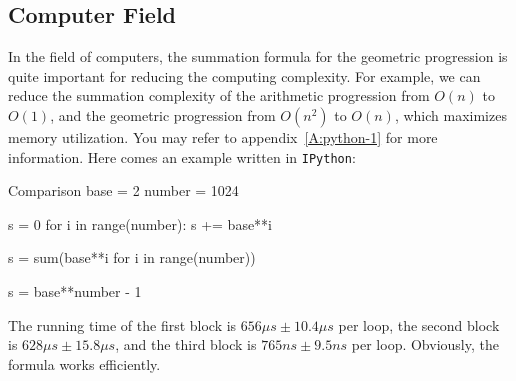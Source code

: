 \subsection{Computer Field}
In the field of computers, the summation formula for the geometric progression is quite important for reducing the computing complexity. For example, we can reduce the summation complexity of the arithmetic progression from $O(n)$ to $O(1)$, and the geometric progression from $O(n^2)$ to $O(n)$, which maximizes memory utilization. You may refer to appendix~\ref{A:python-1} for more information. Here comes an example written in \texttt{IPython}\cite{PER-GRA:2007}:
\begin{pylist}{Comparison}
base = 2
number = 1024

s = 0
for i in range(number):
    s += base**i

s = sum(base**i for i in range(number))

s = base**number - 1
\end{pylist}

The running time of the first block is $656 \mu s ± 10.4\mu s$ per loop, the second block is $628 \mu s ± 15.8 \mu s$, and the third block is $765 ns ± 9.5 ns$ per loop. Obviously, the formula works efficiently.
